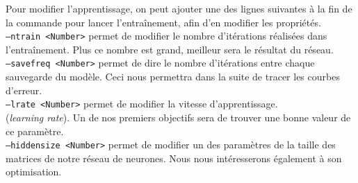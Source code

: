 \documentclass{article}
\begin{document}
Pour modifier l'apprentissage, on peut ajouter une des lignes suivantes à la fin de la commande pour lancer l'entraînement, afin d'en modifier les propriétés. \\
\noindent \texttt{--ntrain <Number>} permet de modifier le nombre d'itérations réalisées dans l'entraînement. Plus ce nombre est grand, meilleur sera le résultat du réseau. \\
\texttt{--savefreq <Number>} permet de dire le nombre d'itérations entre chaque sauvegarde du modèle. Ceci nous permettra dans la suite de tracer les courbes d'erreur. \\
\texttt{--lrate <Number>} permet de modifier la vitesse d'apprentissage. \\ (\textit{learning rate}). Un de nos premiers objectifs sera de trouver une bonne valeur de ce paramètre. \\
\texttt{--hiddensize <Number>} permet de modifier un des paramètres de la taille des matrices de notre réseau de neurones. Nous nous intéresserons également à son optimisation. \\
\end{document}
